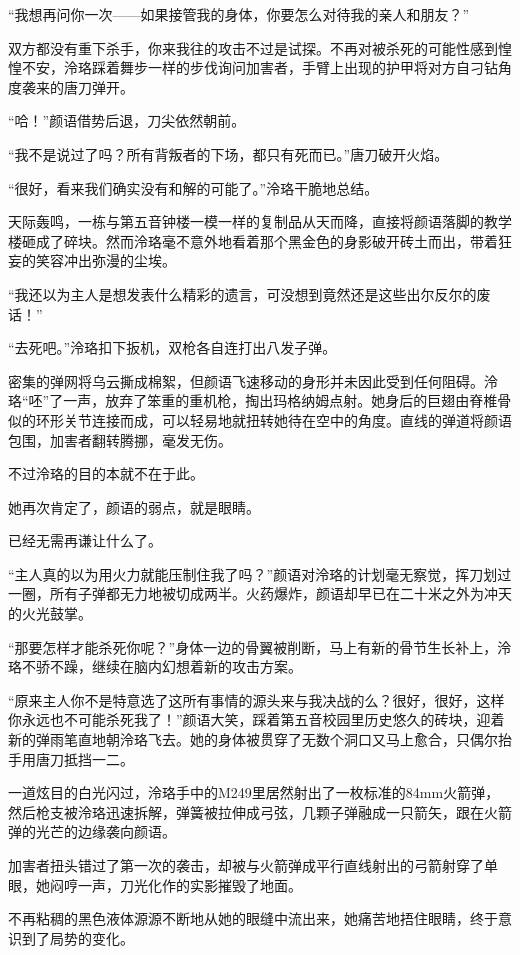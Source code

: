 \documentclass[UTF8, scheme = chinese, openany]{ctexbook}
\begin{document}
“我想再问你一次——如果接管我的身体，你要怎么对待我的亲人和朋友？”

双方都没有重下杀手，你来我往的攻击不过是试探。不再对被杀死的可能性感到惶惶不安，泠珞踩着舞步一样的步伐询问加害者，手臂上出现的护甲将对方自刁钻角度袭来的唐刀弹开。

“哈！”颜语借势后退，刀尖依然朝前。

“我不是说过了吗？所有背叛者的下场，都只有死而已。”唐刀破开火焰。

“很好，看来我们确实没有和解的可能了。”泠珞干脆地总结。

天际轰鸣，一栋与第五音钟楼一模一样的复制品从天而降，直接将颜语落脚的教学楼砸成了碎块。然而泠珞毫不意外地看着那个黑金色的身影破开砖土而出，带着狂妄的笑容冲出弥漫的尘埃。

“我还以为主人是想发表什么精彩的遗言，可没想到竟然还是这些出尔反尔的废话！”

“去死吧。”泠珞扣下扳机，双枪各自连打出八发子弹。

密集的弹网将乌云撕成棉絮，但颜语飞速移动的身形并未因此受到任何阻碍。泠珞“呸”了一声，放弃了笨重的重机枪，掏出玛格纳姆点射。她身后的巨翅由脊椎骨似的环形关节连接而成，可以轻易地就扭转她待在空中的角度。直线的弹道将颜语包围，加害者翻转腾挪，毫发无伤。

不过泠珞的目的本就不在于此。

她再次肯定了，颜语的弱点，就是眼睛。

已经无需再谦让什么了。

“主人真的以为用火力就能压制住我了吗？”颜语对泠珞的计划毫无察觉，挥刀划过一圈，所有子弹都无力地被切成两半。火药爆炸，颜语却早已在二十米之外为冲天的火光鼓掌。

“那要怎样才能杀死你呢？”身体一边的骨翼被削断，马上有新的骨节生长补上，泠珞不骄不躁，继续在脑内幻想着新的攻击方案。

“原来主人你不是特意选了这所有事情的源头来与我决战的么？很好，很好，这样你永远也不可能杀死我了！”颜语大笑，踩着第五音校园里历史悠久的砖块，迎着新的弹雨笔直地朝泠珞飞去。她的身体被贯穿了无数个洞口又马上愈合，只偶尔抬手用唐刀抵挡一二。

一道炫目的白光闪过，泠珞手中的M249里居然射出了一枚标准的84mm火箭弹，然后枪支被泠珞迅速拆解，弹簧被拉伸成弓弦，几颗子弹融成一只箭矢，跟在火箭弹的光芒的边缘袭向颜语。

加害者扭头错过了第一次的袭击，却被与火箭弹成平行直线射出的弓箭射穿了单眼，她闷哼一声，刀光化作的实影摧毁了地面。

不再粘稠的黑色液体源源不断地从她的眼缝中流出来，她痛苦地捂住眼睛，终于意识到了局势的变化。
\end{document}
